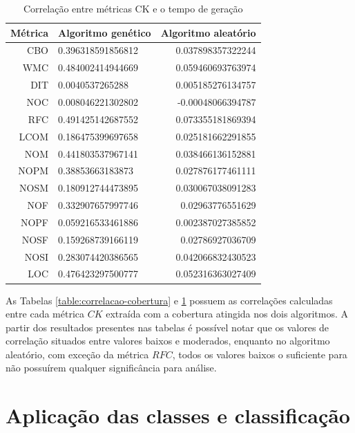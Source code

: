 \documentclass[
	12pt,				%
	oneside,			%
	a4paper,			%
	english,			%
	brazil				%
	]{abntex2ppgsi}
\begin{document}
\begin{table}[h]
\centering
\caption{Correlação entre métricas CK e o tempo de geração}
\vspace{0.5cm}
\begin{tabular}{r|lr}

										
Métrica & Algoritmo genético & Algoritmo aleatório \\ %
\hline                               %
CBO		& 0.396318591856812		& 0.037898357322244 \\
WMC		& 0.484002414944669		& 0.059460693763974 \\
DIT		& 0.0040537265288		& 0.005185276134757 \\
NOC		& 0.008046221302802		& -0.00048066394787 \\
RFC		& 0.491425142687552		& 0.073355181869394 \\
LCOM		& 0.186475399697658	& 	0.025181662291855 \\
NOM		& 0.441803537967141		& 0.038466136152881 \\
NOPM		& 0.38853663183873		& 0.027876177461111 \\
NOSM		& 0.180912744473895	& 	0.030067038091283 \\
NOF		& 0.332907657997746	& 	0.02963776551629 \\
NOPF		& 0.059216533461886	& 	0.002387027385852 \\
NOSF		& 0.159268739166119		& 0.02786927036709 \\
NOSI		& 0.283074420386565		& 0.042066832430523 \\
LOC		& 0.476423297500777	& 0.052316363027409
\end{tabular}
\label{table:correlacao-tempo}
\end{table}

As Tabelas \ref{table:correlacao-cobertura} e \ref{table:correlacao-tempo} possuem as correlações calculadas entre cada métrica $CK$ extraída com a cobertura atingida nos dois algoritmos. A partir dos resultados presentes nas tabelas é possível notar que os valores de correlação situados entre valores baixos e moderados, enquanto no algoritmo aleatório, com exceção da métrica $RFC$, todos os valores baixos o suficiente para não possuírem qualquer significância para análise.

\section{Aplicação das classes e classificação}
\end{document}
